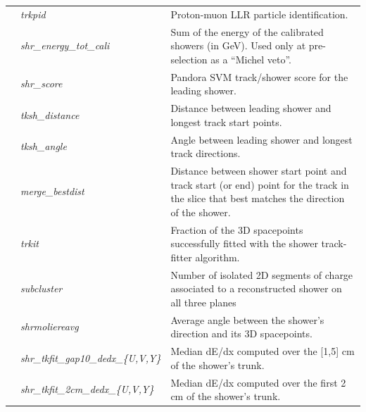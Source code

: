 \begin{table}[ht]
\begin{tabular}{ m{} | m{} | m{}  }
\hline
\multicolumn{1}{l|}{} & \emph{trkpid}  &  Proton-muon LLR particle identification. \\  \cline{2-3}
\parbox[t]{2mm}{}  & \emph{shr\_energy\_tot\_cali}  & Sum  of  the  energy  of  the  calibrated  showers  (in  GeV). Used  only  at pre-selection as a ``Michel veto”.\\  
 & \emph{shr\_score} & Pandora  SVM track/shower score for the leading shower.\\  
  & \emph{tksh\_distance}  & Distance between leading shower and longest track start points.\\  
 & \emph{tksh\_angle}  & Angle  between  leading  shower   and  longest  track directions.\\  
 & \emph{merge\_bestdist}  & Distance between shower start point and track start (or end) point for the track in the slice that best matches the direction of the shower.\\  
 & \emph{trkit} & Fraction of the 3D spacepoints successfully fitted with the shower track-fitter algorithm. \\  
 & \emph{subcluster} & Number of isolated 2D segments of charge associated to a reconstructed shower on all three planes  \\  
 & \emph{shrmoliereavg} &  Average angle between the shower’s direction and its 3D spacepoints.    \\ 
 & \emph{shr\_tkfit\_gap10\_dedx\_\{U,V,Y\}}  & Median dE/dx computed over the [1,5] cm of the shower’s  trunk. \\ 
 & \emph{shr\_tkfit\_2cm\_dedx\_\{U,V,Y\}}  & Median dE/dx computed  over  the first 2 cm of the shower’s  trunk. \\ 
\hline


\end{tabular}
\end{table}
